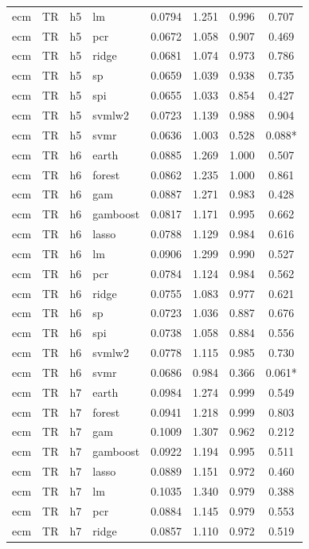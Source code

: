 \begin{ThreePartTable}
\begin{longtable}[t]{llclcccc}
ecm & TR & h5 & lm & 0.0794 & 1.251 & 0.996 & 0.707\\
ecm & TR & h5 & pcr & 0.0672 & 1.058 & 0.907 & 0.469\\
ecm & TR & h5 & ridge & 0.0681 & 1.074 & 0.973 & 0.786\\
ecm & TR & h5 & sp & 0.0659 & 1.039 & 0.938 & 0.735\\
ecm & TR & h5 & spi & 0.0655 & 1.033 & 0.854 & 0.427\\
ecm & TR & h5 & svmlw2 & 0.0723 & 1.139 & 0.988 & 0.904\\
ecm & TR & h5 & svmr & 0.0636 & 1.003 & 0.528 & 0.088*\\
\addlinespace
ecm & TR & h6 & earth & 0.0885 & 1.269 & 1.000 & 0.507\\
ecm & TR & h6 & forest & 0.0862 & 1.235 & 1.000 & 0.861\\
ecm & TR & h6 & gam & 0.0887 & 1.271 & 0.983 & 0.428\\
ecm & TR & h6 & gamboost & 0.0817 & 1.171 & 0.995 & 0.662\\
ecm & TR & h6 & lasso & 0.0788 & 1.129 & 0.984 & 0.616\\
ecm & TR & h6 & lm & 0.0906 & 1.299 & 0.990 & 0.527\\
ecm & TR & h6 & pcr & 0.0784 & 1.124 & 0.984 & 0.562\\
ecm & TR & h6 & ridge & 0.0755 & 1.083 & 0.977 & 0.621\\
ecm & TR & h6 & sp & 0.0723 & 1.036 & 0.887 & 0.676\\
ecm & TR & h6 & spi & 0.0738 & 1.058 & 0.884 & 0.556\\
ecm & TR & h6 & svmlw2 & 0.0778 & 1.115 & 0.985 & 0.730\\
ecm & TR & h6 & svmr & 0.0686 & 0.984 & 0.366 & 0.061*\\
\addlinespace
ecm & TR & h7 & earth & 0.0984 & 1.274 & 0.999 & 0.549\\
ecm & TR & h7 & forest & 0.0941 & 1.218 & 0.999 & 0.803\\
ecm & TR & h7 & gam & 0.1009 & 1.307 & 0.962 & 0.212\\
ecm & TR & h7 & gamboost & 0.0922 & 1.194 & 0.995 & 0.511\\
ecm & TR & h7 & lasso & 0.0889 & 1.151 & 0.972 & 0.460\\
ecm & TR & h7 & lm & 0.1035 & 1.340 & 0.979 & 0.388\\
ecm & TR & h7 & pcr & 0.0884 & 1.145 & 0.979 & 0.553\\
ecm & TR & h7 & ridge & 0.0857 & 1.110 & 0.972 & 0.519\\

\end{longtable}
\end{ThreePartTable}

